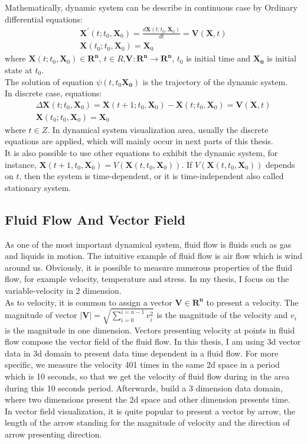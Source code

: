 \documentclass[
     11pt,         %
     a4paper,      %
     oneside,
     ]{article}
\newcommand{\vect}[1]{\boldsymbol{#1}}
\begin{document}
	Mathematically, dynamic system can be describe in continuous case by Ordinary differential equations:
	\begin{eqnarray}
		\vect{X}^{'}(t;t_{0},\vect{X}_{0})=\frac{d\vect{X}(t;t_{0},\vect{X}_{0})}{dt}=\vect{V}(\vect{X},t)\\
		\vect{X}(t_{0};t_{0},\vect{X}_{0})=\vect{X}_{0}
	\end{eqnarray}
	where $\vect{X}(t;t_{0},\vect{X}_{0})\in \vect{R^{n}}$, $t\in R$,$\vect{V}:\vect{R^{n}}\rightarrow\vect{R^{n}}$, $t_{0}$ is initial time and $\vect{X_{0}}$ is initial state at $t_{0}$.\\
	The solution of equation $\psi(t,t_{0}\vect{X_{0}})$ is the trajectory of the dynamic system.\\
	In discrete case, equations:
	\begin{eqnarray}
		\Delta\vect{X}(t;t_{0},\vect{X}_{0})=\vect{X}(t+1;t_{0},\vect{X}_{0})-\vect{X}(t;t_{0},\vect{X}_{0})=\vect{V}(\vect{X},t)\\
		\vect{X}(t_{0};t_{0},\vect{X}_{0})=\vect{X}_{0}
	\end{eqnarray}
	where $t\in Z$. In dynamical system visualization area, usually the discrete equations are applied, which will mainly occur in next parts of this thesis.\\
	It is also possible to use other equations to exhibit the dynamic system, for instance, $\vect{X}(t+1,t_{0},\vect{X}_{0})=V(\vect{X}(t,t_{0},\vect{X}_{0}))$. If $V(\vect{X}(t,t_{0},\vect{X}_{0}))$ depends on $t$, then the system is time-dependent, or it is time-independent also called stationary system.
	
	\subsection{Fluid Flow And Vector Field}
	As one of the most important dynamical system, fluid flow is fluids such as gas and liquids in motion. The intuitive example of fluid flow is air flow which is wind around us. Obviously, it is possible to measure numerous properties of the fluid flow, for example velocity, temperature and stress. In my thesis, I focus on the variable-velocity in 2 dimension.\\
	As to velocity, it is common to assign a vector $\vect{V}\in \vect{R^{n}}$ to present a velocity. The magnitude of vector $\lvert\vect{V}\rvert=\sqrt{\sum_{i=0}^{i=n-1}v_{i}^{2}}$ is the magnitude of the velocity and $v_{i}$ is the magnitude in one dimension. Vectors presenting velocity at points in fluid flow compose the vector field of the fluid flow. In this thesis, I am using 3d vector data in 3d domain to present data time dependent in a fluid flow. For more specific, we measure the velocity 401 times in the same 2d space in a period which is 10 seconds, so that we get the velocity of fluid flow during in the area during this 10 seconds period. Afterwards, build a 3 dimension data domain, where two dimensions present the 2d space and other dimension presents time. \\
	In vector field visualization, it is quite popular to present a vector by arrow, the length of the arrow standing for the magnitude of velocity and the direction of arrow presenting direction.
\end{document}
